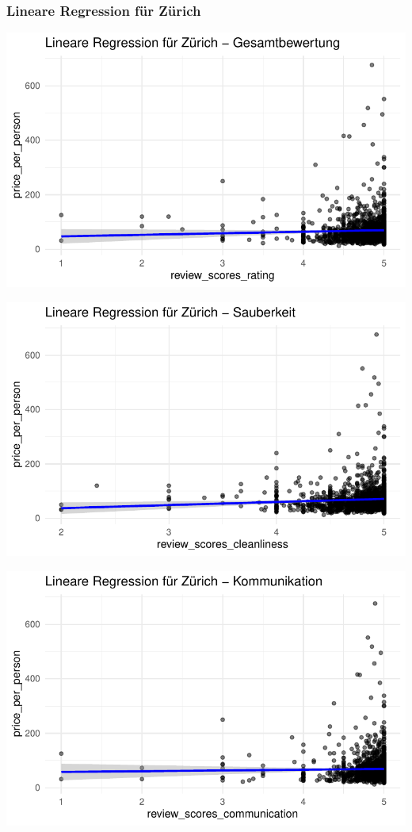 \documentclass[
  journal,
]{IEEEtran}%
\begin{document}
\hypertarget{lineare-regression-fuxfcr-zuxfcrich}{%
\subsubsection{Lineare Regression für
Zürich}\label{lineare-regression-fuxfcr-zuxfcrich}}

\includegraphics{main_files/figure-pdf/unnamed-chunk-13-1.pdf}

\includegraphics{main_files/figure-pdf/unnamed-chunk-13-2.pdf}

\includegraphics{main_files/figure-pdf/unnamed-chunk-13-3.pdf}
\end{document}
